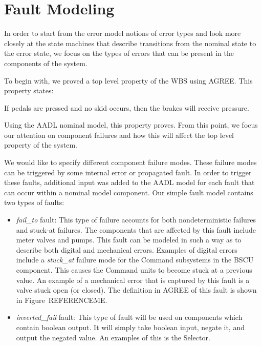 \section{Fault Modeling}

In order to start from the error model notions of error types and look more closely at the state machines that describe transitions from the nominal state to the error state, we focus on the types of errors that can be present in the components of the system. 

To begin with, we proved a top level property of the WBS using AGREE. This property states: \\

\begin{tt}
If pedals are pressed and no skid occurs, then the brakes will receive pressure. \\
\end{tt}

Using the AADL nominal model, this property proves. From this point, we focus our attention on component failures and how this will affect the top level property of the system. 

We would like to specify different component failure modes. These failure modes can be triggered by some internal error or propagated fault. In order to trigger these faults, additional input was added to the AADL model for each fault that can occur within a nominal model component. Our simple fault model contains two types of faults:

\begin{itemize}
\item \textit{fail\_to} fault: This type of failure accounts for both nondeterministic failures and stuck-at failures. The components that are affected by this fault include meter valves and pumps. This fault can be modeled in such a way as to describe both digital and mechanical errors. Examples of digital errors include a \textit{stuck\_at} failure mode for the Command subsystems in the BSCU component. This causes the Command units to become stuck at a previous value. An example of a mechanical error that is captured by this fault is a valve stuck open (or closed). The definition in AGREE of this fault is shown in Figure~REFERENCEME.\\


\item \textit{inverted\_fail} fault: This type of fault will be used on components which contain boolean output. It will simply take boolean input, negate it, and output the negated value. An examples of this is the Selector.
\end{itemize}


